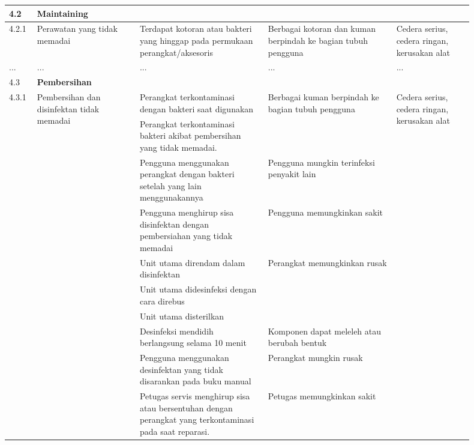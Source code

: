 \documentclass[11pt,a4paper,twoside,onecolumn]{book}
\begin{document}
\begin{longtable}{p{0.05\linewidth} p{0.20\linewidth} p{0.25\linewidth} p{0.25\linewidth} p{0.15\linewidth}}
				
				\hline
				4.2 & \multicolumn{4}{l}{\textbf{Maintaining}} \\
				\hline
				4.2.1 & Perawatan yang tidak memadai & Terdapat kotoran atau bakteri yang hinggap pada permukaan perangkat/aksesoris & Berbagai kotoran dan kuman berpindah ke bagian tubuh pengguna  & Cedera serius, cedera ringan, kerusakan alat  \\
				\hline
				... & ... & ... & ... & ... \\ \hline
				\hline
				
				\hline
				4.3 & \multicolumn{4}{l}{\textbf{Pembersihan}} \\
				\hline
				4.3.1 & \multirow[t]{11}{\linewidth}{Pembersihan dan disinfektan tidak memadai} & Perangkat terkontaminasi dengan bakteri saat digunakan & \multirow{2}{\linewidth}{Berbagai kuman berpindah ke bagian tubuh pengguna} & \multirow{11}{\linewidth}{Cedera serius, cedera ringan, kerusakan alat} \\ \cline{3-3}
				 &  & Perangkat terkontaminasi bakteri akibat pembersihan yang tidak memadai. &  & \\ \cline{3-4}
				 &  & Pengguna menggunakan perangkat dengan bakteri setelah yang lain menggunakannya & Pengguna mungkin terinfeksi penyakit lain & \\ \cline{3-4}
				 &  & Pengguna menghirup sisa disinfektan dengan pembersiahan yang tidak memadai & Pengguna memungkinkan sakit & \\ \cline{3-4}
				 &  & Unit utama direndam dalam disinfektan & \multirow{3}{\linewidth}{Perangkat memungkinkan rusak} & \\ \cline{3-3}
			 	 &  & Unit utama didesinfeksi dengan cara direbus  & & \\ \cline{3-3}
			 	 &  & Unit utama disterilkan  & & \\ \cline{3-4}
			 	 &  & Desinfeksi mendidih berlangsung selama 10 menit  & Komponen dapat meleleh atau berubah bentuk & \\\cline{3-4}
			 	 &  & Pengguna menggunakan desinfektan yang tidak disarankan pada buku manual  & Perangkat mungkin rusak  &  \\ \cline{3-4}
			 	 &  & Petugas servis menghirup sisa atau bersentuhan dengan perangkat yang terkontaminasi pada saat reparasi. & Petugas memungkinkan sakit & \\ \cline{1-5}
			 	 	 
				\hline
				
			\end{longtable}
		
\end{document}
